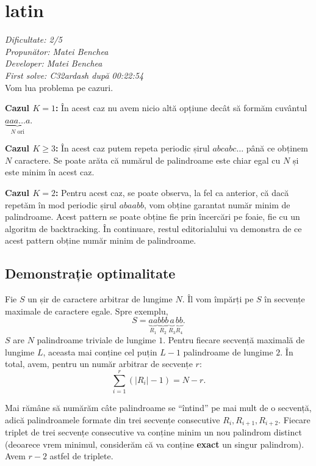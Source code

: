 \section{latin}
\textit{Dificultate: 2/5} \\
\textit{Propunător: Matei Benchea} \\
\textit{Developer: Matei Benchea} \\
\textit{First solve: C32ardash după 00:22:54}  \\

Vom lua problema pe cazuri.

\textbf{Cazul $K = 1$:} În acest caz nu avem nicio altă opțiune decât să formăm cuvântul $\underbrace{ aaa \dots  a}_{ N \text{ ori} }$.

\textbf{Cazul $K \geq 3$:} În acest caz putem repeta periodic șirul $abcabc\dots$ până ce obținem $N$ caractere. Se poate arăta că numărul de palindroame este chiar egal cu $N$ și este minim în acest caz.


\textbf{Cazul $K = 2$:} Pentru acest caz, se poate observa, la fel ca anterior, că dacă repetăm în mod periodic șirul $abaabb$, vom obține garantat număr minim de palindroame. Acest pattern se poate obține fie prin încercări pe foaie, fie cu un algoritm de backtracking. În continuare, restul editorialului va demonstra de ce acest pattern obține număr minim de palindroame.

\subsection*{Demonstrație optimalitate}

Fie $S$ un șir de caractere arbitrar de lungime $N$. Îl vom împărți pe $S$ în secvențe maximale de caractere egale. Spre exemplu,
\[
    S = \underbrace{ aa }_{ R_{1} }\underbrace{ bbb }_{ R_{2} }\underbrace{ a }_{ R_{3} }\underbrace{ bb }_{ R_{4} }.
\]
$S$ are $N$ palindroame triviale de lungime $1$. Pentru fiecare secvență maximală de lungime $L$, aceasta mai conține cel puțin $L - 1$ palindroame de lungime $2$. În total, avem, pentru un număr arbitrar de secvențe $r$:
\[
    \sum_{i=1}^{r}(\left| R_{i} \right| - 1) = N - r
.\]

Mai rămâne să numărăm câte palindroame se ``întind'' pe mai mult de o secvență, adică palindroamele formate din trei secvențe consecutive $R_{i}, R_{i+1}, R_{i+2}$. Fiecare triplet de trei secvențe consecutive va conține minim un nou palindrom distinct (deoarece vrem minimul, considerăm că va conține \textbf{exact} un singur palindrom). Avem $r - 2$ astfel de triplete.

